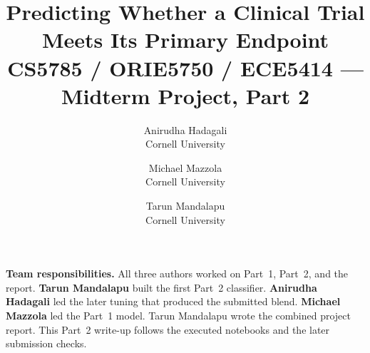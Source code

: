 \documentclass[10pt,twocolumn,letterpaper]{article}
\title{Predicting Whether a Clinical Trial\\
Meets Its Primary Endpoint\\
\vspace{0.35em}
\large CS5785 / ORIE5750 / ECE5414 --- Midterm Project, Part 2}
\author{Anirudha Hadagali\\
Cornell University
\and
Michael Mazzola\\
Cornell University
\and
Tarun Mandalapu\\
Cornell University
}
\begin{document}
\maketitle



\noindent\textbf{Team responsibilities.}
All three authors worked on Part~1, Part~2, and the report.
\textbf{Tarun Mandalapu} built the first Part~2 classifier.
\textbf{Anirudha Hadagali} led the later tuning that produced the submitted
blend. \textbf{Michael Mazzola} led the Part~1 model.
Tarun Mandalapu wrote the combined project report. This Part~2 write-up
follows the executed notebooks and the later submission checks.





{
    \small
    
    
}
\end{document}
